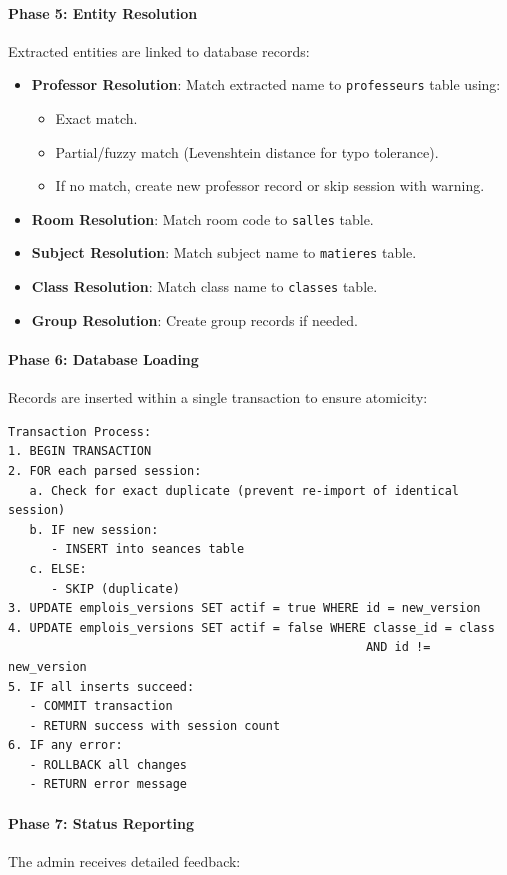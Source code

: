 \begin{fig}[H]
\paragraph{Phase 5: Entity Resolution}
Extracted entities are linked to database records:

\begin{itemize}
    \item \textbf{Professor Resolution}: Match extracted name to \texttt{professeurs} table using:
    \begin{itemize}
        \item Exact match.
        \item Partial/fuzzy match (Levenshtein distance for typo tolerance).
        \item If no match, create new professor record or skip session with warning.
    \end{itemize}
    
    \item \textbf{Room Resolution}: Match room code to \texttt{salles} table.
    \item \textbf{Subject Resolution}: Match subject name to \texttt{matieres} table.
    \item \textbf{Class Resolution}: Match class name to \texttt{classes} table.
    \item \textbf{Group Resolution}: Create group records if needed.
\end{itemize}

\paragraph{Phase 6: Database Loading}
Records are inserted within a single transaction to ensure atomicity:

\begin{verbatim}
Transaction Process:
1. BEGIN TRANSACTION
2. FOR each parsed session:
   a. Check for exact duplicate (prevent re-import of identical session)
   b. IF new session:
      - INSERT into seances table
   c. ELSE:
      - SKIP (duplicate)
3. UPDATE emplois_versions SET actif = true WHERE id = new_version
4. UPDATE emplois_versions SET actif = false WHERE classe_id = class 
                                                  AND id != new_version
5. IF all inserts succeed:
   - COMMIT transaction
   - RETURN success with session count
6. IF any error:
   - ROLLBACK all changes
   - RETURN error message
\end{verbatim}

\paragraph{Phase 7: Status Reporting}
The admin receives detailed feedback:


\end{fig}
